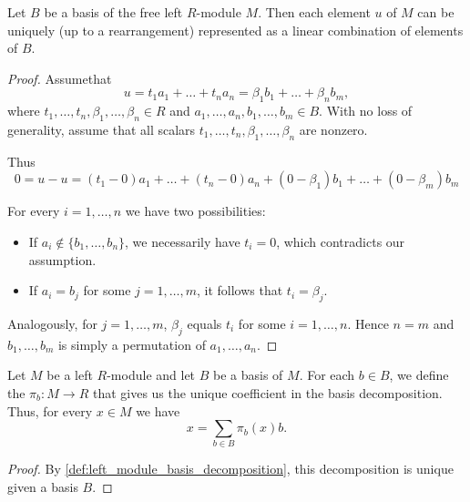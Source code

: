 \begin{proposition}\label{def:left_module_basis_decomposition}
  Let \( B \) be a basis of the free left \( R \)-module \( M \). Then each element \( u \) of \( M \) can be uniquely (up to a rearrangement) represented as a linear combination of elements of \( B \).
\end{proposition}
\begin{proof}
  Assume\LEM that
  \begin{equation*}
    u = t_1 a_1 + \ldots + t_n a_n = \beta_1 b_1 + \ldots + \beta_n b_m,
  \end{equation*}
  where \( t_1, \ldots, t_n, \beta_1, \ldots, \beta_n \in R \) and \( a_1, \ldots, a_n, b_1, \ldots, b_m \in B \). With no loss of generality, assume that all scalars \( t_1, \ldots, t_n, \beta_1, \ldots, \beta_n \) are nonzero.

  Thus
  \begin{equation*}
    0 = u - u = (t_1 - 0) a_1 + \ldots + (t_n - 0) a_n + (0 - \beta_1) b_1 + \ldots + (0 - \beta_m) b_m
  \end{equation*}

  For every \( i = 1, \ldots, n \) we have two possibilities:
  \begin{itemize}
    \item If \( a_i \not\in \{ b_1, \ldots, b_n \} \), we necessarily have \( t_i = 0 \), which contradicts our assumption.
    \item If \( a_i = b_j \) for some \( j = 1, \ldots, m \), it follows that \( t_i = \beta_j \).
  \end{itemize}

  Analogously, for \( j = 1, \ldots, m \), \( \beta_j \) equals \( t_i \) for some \( i = 1, \ldots, n \). Hence \( n = m \) and \( b_1, \ldots, b_m \) is simply a permutation of \( a_1, \ldots, a_n \).
\end{proof}

\begin{definition}\label{def:left_module_basis_projection}
  Let \( M \) be a left \( R \)-module and let \( B \) be a basis of \( M \). For each \( b \in B \), we define the  \( \pi_b: M \to R \) that gives us the unique coefficient in the basis decomposition. Thus, for every \( x \in M \) we have
  \begin{equation*}
    x = \sum_{b \in B} \pi_b(x) b.
  \end{equation*}
\end{definition}
\begin{proof}
  By \cref{def:left_module_basis_decomposition}, this decomposition is unique given a basis \( B \).
\end{proof}

